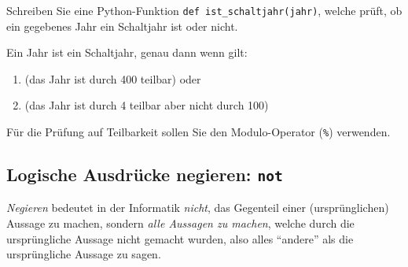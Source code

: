 \begin{mychallenge}
	Schreiben Sie eine Python-Funktion \lstinline|def ist_schaltjahr(jahr)|, welche prüft, ob ein gegebenes Jahr ein Schaltjahr ist oder nicht.

	Ein Jahr ist ein Schaltjahr, genau dann wenn gilt:
	\begin{enumerate}
		\item (das Jahr ist durch 400 teilbar) oder
		\item (das Jahr ist durch 4 teilbar aber nicht durch 100)
	\end{enumerate}
	Für die Prüfung auf Teilbarkeit sollen Sie den Modulo-Operator (\lstinline|%|) verwenden.
	\begin{myanswer}
		
	\end{myanswer}
\end{mychallenge}

\subsection{Logische Ausdrücke negieren: \texorpdfstring{\lstinline|not|}{not}}
\textit{Negieren} bedeutet in der Informatik \textit{nicht}, das Gegenteil einer (ursprünglichen) Aussage zu machen, sondern \textit{alle Aussagen zu machen}, welche durch die ursprüngliche Aussage nicht gemacht wurden, also alles \enquote{andere} als die ursprüngliche Aussage zu sagen.


